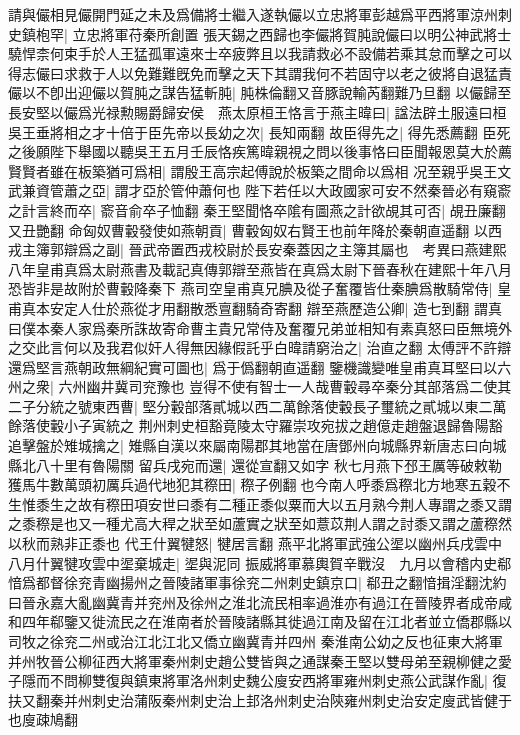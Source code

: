 請與儼相見儼開門延之未及爲備將士繼入遂執儼以立忠將軍彭越爲平西將軍涼州刺史鎮枹罕|{
	立忠將軍苻秦所創置}
張天錫之西歸也李儼將賀肫說儼曰以明公神武將士驍悍柰何束手於人王猛孤軍遠來士卒疲弊且以我請救必不設備若乘其怠而擊之可以得志儼曰求救于人以免難難旣免而擊之天下其謂我何不若固守以老之彼將自退猛責儼以不卽出迎儼以賀肫之謀告猛斬肫|{
	肫株倫翻又音豚說輸芮翻難乃旦翻}
以儼歸至長安堅以儼爲光禄勲賜爵歸安侯　燕太原桓王恪言于燕主暐曰|{
	諡法辟土服遠曰桓}
吳王垂將相之才十倍于臣先帝以長幼之次|{
	長知兩翻}
故臣得先之|{
	得先悉薦翻}
臣死之後願陛下舉國以聽吳王五月壬辰恪疾篤暐親視之問以後事恪曰臣聞報恩莫大於薦賢賢者雖在板築猶可爲相|{
	謂殷王高宗起傅說於板築之間命以爲相}
况至親乎吳王文武兼資管蕭之亞|{
	謂才亞於管仲蕭何也}
陛下若任以大政國家可安不然秦晉必有窺窬之計言終而卒|{
	窬音俞卒子恤翻}
秦王堅聞恪卒隂有圖燕之計欲覘其可否|{
	覘丑廉翻又丑艷翻}
命匈奴曹轂發使如燕朝貢|{
	曹轂匈奴右賢王也前年降於秦朝直遥翻}
以西戎主簿郭辯爲之副|{
	晉武帝置西戎校尉於長安秦蓋因之主簿其屬也　考異曰燕建熙八年皇甫真爲太尉燕書及載記真傳郭辯至燕皆在真爲太尉下晉春秋在建熙十年八月恐皆非是故附於曹轂降秦下}
燕司空皇甫真兄腆及從子奮覆皆仕秦腆爲散騎常侍|{
	皇甫真本安定人仕於燕從才用翻散悉亶翻騎奇寄翻}
辯至燕歷造公卿|{
	造七到翻}
謂真曰僕本秦人家爲秦所誅故寄命曹主貴兄常侍及奮覆兄弟並相知有素真怒曰臣無境外之交此言何以及我君似奸人得無因緣假託乎白暐請窮治之|{
	治直之翻}
太傅評不許辯還爲堅言燕朝政無綱紀實可圖也|{
	爲于僞翻朝直遥翻}
鑒機識變唯皇甫真耳堅曰以六州之衆|{
	六州幽井冀司兖豫也}
豈得不使有智士一人哉曹轂尋卒秦分其部落爲二使其二子分統之號東西曹|{
	堅分轂部落貳城以西二萬餘落使轂長子璽統之貳城以東二萬餘落使轂小子寅統之}
荆州刺史桓豁竟陵太守羅崇攻宛拔之趙億走趙盤退歸魯陽豁追擊盤於雉城擒之|{
	雉縣自漢以來屬南陽郡其地當在唐鄧州向城縣界新唐志曰向城縣北八十里有魯陽關}
留兵戌宛而還|{
	還從宣翻又如字}
秋七月燕下邳王厲等破敕勒獲馬牛數萬頭初厲兵過代地犯其穄田|{
	穄子例翻也今南人呼黍爲穄北方地寒五穀不生惟黍生之故有穄田項安世曰黍有二種正黍似粟而大以五月熟今荆人專謂之黍又謂之黍穄是也又一種尤高大稈之狀至如蘆實之狀至如薏苡荆人謂之討黍又謂之蘆穄然以秋而熟非正黍也}
代王什翼犍怒|{
	犍居言翻}
燕平北將軍武強公埿以幽州兵戌雲中八月什翼犍攻雲中埿棄城走|{
	埿與泥同}
振威將軍慕輿賀辛戰沒　九月以會稽内史郗愔爲都督徐兖青幽揚州之晉陵諸軍事徐兖二州刺史鎮京口|{
	郗丑之翻愔揖淫翻沈約曰晉永嘉大亂幽冀青并兖州及徐州之淮北流民相率過淮亦有過江在晉陵界者成帝咸和四年郗鑒又徙流民之在淮南者於晉陵諸縣其徙過江南及留在江北者並立僑郡縣以司牧之徐兖二州或治江北江北又僑立幽冀青并四州}
秦淮南公幼之反也征東大將軍并州牧晉公柳征西大將軍秦州刺史趙公雙皆與之通謀秦王堅以雙母弟至親柳健之愛子隱而不問柳雙復與鎮東將軍洛州刺史魏公廋安西將軍雍州刺史燕公武謀作亂|{
	復扶又翻秦并州刺史治蒲阪秦州刺史治上邽洛州刺史治陝雍州刺史治安定廋武皆健于也廋疎鳩翻}
